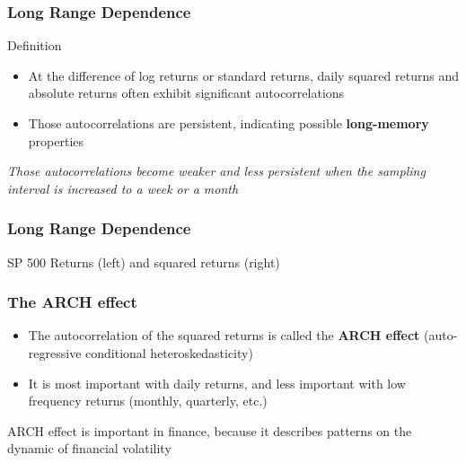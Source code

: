 \documentclass{beamer}
\begin{document}
\begin{frame}
  \frametitle{Long Range Dependence}
  \begin{block}{Definition}
    \begin{itemize}
    \item At the difference of log returns or standard returns, daily squared returns and absolute returns often exhibit significant autocorrelations
    \item Those autocorrelations are persistent, indicating possible \textbf{long-memory} properties
    \end{itemize}
  \end{block}

\emph{Those autocorrelations become weaker and less persistent when the sampling interval is increased to a week or a month}\\
  
\end{frame}


\begin{frame}
  \frametitle{Long Range Dependence}
  SP 500 Returns (left) and squared returns (right) \\

\medskip
  
\end{frame}



\begin{frame}
  \frametitle{The ARCH effect}
  \begin{itemize}
  \item The autocorrelation of the squared returns is called the \textbf{ARCH effect} (auto-regressive conditional heteroskedasticity)
  \item It is most important with daily returns, and less important with low frequency returns (monthly, quarterly, etc.)
  \end{itemize}

\medskip
  
ARCH effect is important in finance, because it describes patterns on the dynamic of financial volatility 
  
\end{frame}
\end{document}
